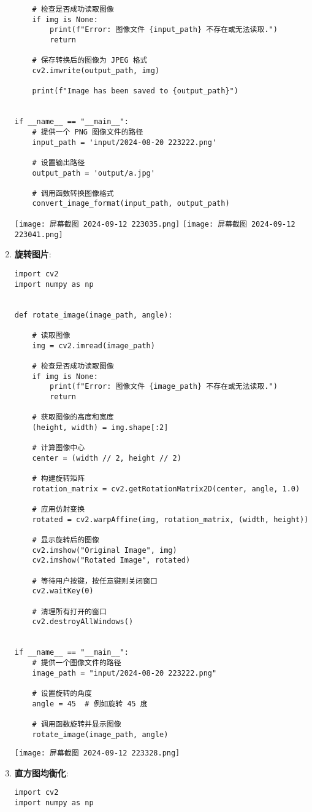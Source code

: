 \documentclass{ctexart}
\begin{document}
\begin{enumerate}[label=\arabic*.]
\begin{lstlisting}
    # 检查是否成功读取图像
    if img is None:
        print(f"Error: 图像文件 {input_path} 不存在或无法读取.")
        return

    # 保存转换后的图像为 JPEG 格式
    cv2.imwrite(output_path, img)

    print(f"Image has been saved to {output_path}")


if __name__ == "__main__":
    # 提供一个 PNG 图像文件的路径
    input_path = 'input/2024-08-20 223222.png'

    # 设置输出路径
    output_path = 'output/a.jpg'

    # 调用函数转换图像格式
    convert_image_format(input_path, output_path)
\end{lstlisting}
\texttt{[image: 屏幕截图 2024-09-12 223035.png]}
\texttt{[image: 屏幕截图 2024-09-12 223041.png]}
\item \textbf{旋转图片}:
\begin{lstlisting}
import cv2
import numpy as np


def rotate_image(image_path, angle):

    # 读取图像
    img = cv2.imread(image_path)

    # 检查是否成功读取图像
    if img is None:
        print(f"Error: 图像文件 {image_path} 不存在或无法读取.")
        return

    # 获取图像的高度和宽度
    (height, width) = img.shape[:2]

    # 计算图像中心
    center = (width // 2, height // 2)

    # 构建旋转矩阵
    rotation_matrix = cv2.getRotationMatrix2D(center, angle, 1.0)

    # 应用仿射变换
    rotated = cv2.warpAffine(img, rotation_matrix, (width, height))

    # 显示旋转后的图像
    cv2.imshow("Original Image", img)
    cv2.imshow("Rotated Image", rotated)

    # 等待用户按键，按任意键则关闭窗口
    cv2.waitKey(0)

    # 清理所有打开的窗口
    cv2.destroyAllWindows()


if __name__ == "__main__":
    # 提供一个图像文件的路径
    image_path = "input/2024-08-20 223222.png"

    # 设置旋转的角度
    angle = 45  # 例如旋转 45 度

    # 调用函数旋转并显示图像
    rotate_image(image_path, angle)
\end{lstlisting}
\texttt{[image: 屏幕截图 2024-09-12 223328.png]}
\item \textbf{直方图均衡化}:
\begin{lstlisting}
import cv2
import numpy as np



\end{lstlisting}
\end{enumerate}
\end{document}

